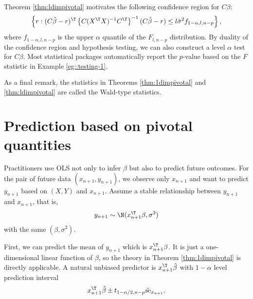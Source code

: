 Theorem \ref{thm:ldimpivotal} motivates the following confidence
region for $C\beta$:
\[
\left\{ r  :(C\hat{\beta}- r )^{\T}\left\{ C(X^{\T}X)^{-1}C^{\T}\right\} ^{-1}(C\hat{\beta}- r)\leq l\hat{\sigma}^{2}
f_{1-\alpha, l, n-p}
\right\} ,
\]
 where $f_{1-\alpha, l, n-p}$ is the upper $\alpha$ quantile of the
$F_{l,n-p}$ distribution. By duality of the confidence region and hypothesis
testing, we can also construct a level $\alpha$ test for $C\beta$. Most statistical packages automatically report the $p$-value based on the $F$ statistic in Example \ref{eg::testing-1}. 
 

As a final remark, the statistics in Theorems \ref{thm:1dimpivotal}
and \ref{thm:ldimpivotal} are called the Wald-type statistics. 

\section{Prediction based on pivotal quantities}\label{sec::prection-normallinear}

Practitioners use OLS not only to infer $\beta$ but also to predict
future outcomes. For the pair of future data $(x_{n+1},y_{n+1})$, we observe
only $x_{n+1}$ and want to predict $y_{n+1}$ based on $(X,Y)$ and $x_{n+1}$.
Assume a stable relationship between $y_{n+1}$ and $x_{n+1}$, that is,
\[
y_{n+1}\sim\N(x_{n+1}^{\T}\beta,\sigma^{2})
\]
with the same $(\beta,\sigma^{2}).$ 

First, we can predict the mean of $y_{n+1}$ which is $x_{n+1}^{\T}\beta$.
It is just a one-dimensional linear function of $\beta$, so the theory
in Theorem \ref{thm:1dimpivotal} is directly applicable. A natural
unbiased predictor is $x_{n+1}^{\T}\hat{\beta}$ with $1-\alpha$ level
prediction interval
\[
 x_{n+1}^{\T}\hat{\beta} \pm t_{1-\alpha/2,  n-p} \hat{\text{se}}_{x_{n+1}} .
\]

